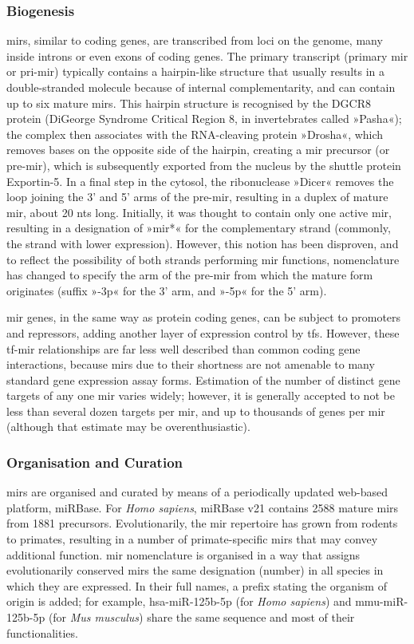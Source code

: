 \subsubsection{Biogenesis}
\acp{mir}, similar to coding genes, are transcribed from loci on the genome, many inside introns or even exons of coding genes.\cite{Rodriguez2004} The primary transcript (primary \ac{mir} or pri-\ac{mir}) typically contains a hairpin-like structure that usually results in a double-stranded molecule because of internal complementarity, and can contain up to six mature \acp{mir}. This hairpin structure is recognised by the DGCR8 protein (DiGeorge Syndrome Critical Region 8, in invertebrates called »Pasha«); the complex then associates with the RNA-cleaving protein »Drosha«, which removes bases on the opposite side of the hairpin, creating a \ac{mir} precursor (or pre-\ac{mir}), which is subsequently exported from the nucleus by the shuttle protein Exportin-5. In a final step in the cytosol, the ribonuclease »Dicer« removes the loop joining the 3' and 5' arms of the pre-\ac{mir}, resulting in a duplex of mature \ac{mir}, about 20 \acp{nt} long. Initially, it was thought to contain only one active \ac{mir}, resulting in a designation of »\ac{mir}*« for the complementary strand (commonly, the strand with lower expression). However, this notion has been disproven, and to reflect the possibility of both strands performing \ac{mir} functions, nomenclature has changed to specify the arm of the pre-\ac{mir} from which the mature form originates (suffix »-3p« for the 3' arm, and »-5p« for the 5' arm).

\ac{mir} genes, in the same way as protein coding genes, can be subject to promoters and repressors, adding another layer of expression control by \acp{tf}. However, these \ac{tf}-\ac{mir} relationships are far less well described than common coding gene interactions, because \acp{mir} due to their shortness are not amenable to many standard gene expression assay forms. Estimation of the number of distinct gene targets of any one \ac{mir} varies widely; however, it is generally accepted to not be less than several dozen targets per \ac{mir}, and up to thousands of genes per \ac{mir} (although that estimate may be overenthusiastic).\cite{Hendrickson2009, Zhdanov2009}

\subsubsection{Organisation and Curation}
\acp{mir} are organised and curated by means of a periodically updated web-based platform, miRBase.\cite{Kozomara2019} For \textit{Homo sapiens}, miRBase v21 contains 2588 mature \acp{mir} from 1881 precursors. Evolutionarily, the \ac{mir} repertoire has grown from rodents to primates, resulting in a number of primate-specific \acp{mir} that may convey additional function. \ac{mir} nomenclature is organised\cite{Ambros2003} in a way that assigns evolutionarily conserved \acp{mir} the same designation (number) in all species in which they are expressed. In their full names, a prefix stating the organism of origin is added; for example, hsa-miR-125b-5p (for \textit{Homo sapiens}) and mmu-miR-125b-5p (for \textit{Mus musculus}) share the same sequence and most of their functionalities.


